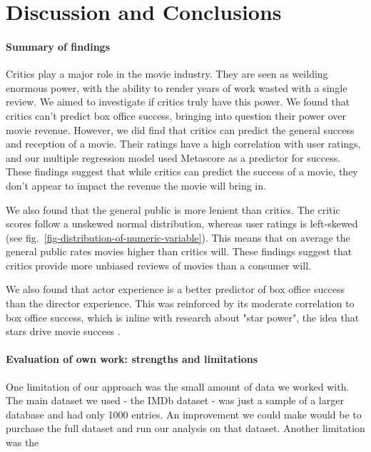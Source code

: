 \section{Discussion and Conclusions}
    \begin{multicols}{2}
        \paragraph{Summary of findings}
            Critics play a major role in the movie industry.
            They are seen as weilding enormous power, with the ability to render years of work wasted with a
                single review.
            We aimed to investigate if critics truly have this power.
            We found that critics can't predict box office success, bringing into question their power over movie
                revenue.
            However, we did find that critics can predict the general success and reception of a movie.
            Their ratings have a high correlation with user ratings, and our multiple regression model used Metascore
                as a predictor for success.
            These findings suggest that while critics can predict the success of a movie, they don't appear to impact
                the revenue the movie will bring in.

            We also found that the general public is more lenient than critics.
            The critic scores follow a unskewed normal distribution, whereas user ratings is left-skewed (see fig.~\ref{fig-distribution-of-numeric-variable}).
            This means that on average the general public rates movies higher than critics will.
            These findings suggest that critics provide more unbiased reviews of movies than a consumer will.

            We also found that actor experience is a better predictor of box office success than the director experience.
            This was reinforced by its moderate correlation to box office success, which is inline with research 
                about "star power", the idea that stars drive movie success \cite{bibid}.
            
        \paragraph{Evaluation of own work: strengths and limitations}
            One limitation of our approach was the small amount of data we worked with.
            The main dataset we used - the IMDb dataset - was just a sample of a larger
                database and had only 1000 entries.
            An improvement we could make would be to purchase the full dataset and run our
                analysis on that dataset.
            Another limitation was the 
            

\end{multicols}
